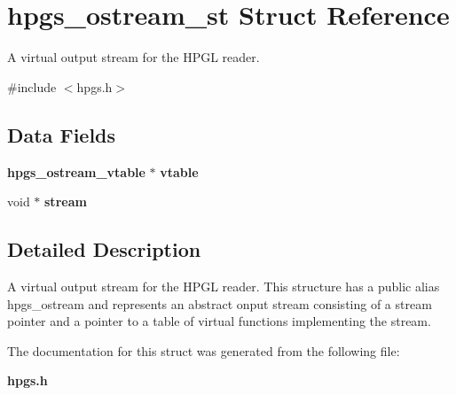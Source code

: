 \section{hpgs\_\-ostream\_\-st Struct Reference}
\label{structhpgs__ostream__st}


A virtual output stream for the HPGL reader.  




{\ttfamily \#include $<$hpgs.h$>$}

\subsection*{Data Fields}
\begin{DoxyCompactItemize}
\item 
{\bf hpgs\_\-ostream\_\-vtable} $\ast$ {\bfseries vtable}\label{structhpgs__ostream__st_ab483e6635fb331ce2daa35976b895e66}

\item 
void $\ast$ {\bfseries stream}\label{structhpgs__ostream__st_adec8c7e73498abdcf10bc25c0dc94383}

\end{DoxyCompactItemize}


\subsection{Detailed Description}
A virtual output stream for the HPGL reader. This structure has a public alias {\ttfamily hpgs\_\-ostream} and represents an abstract onput stream consisting of a stream pointer and a pointer to a table of virtual functions implementing the stream. 

The documentation for this struct was generated from the following file:\begin{DoxyCompactItemize}
\item 
{\bf hpgs.h}\end{DoxyCompactItemize}
